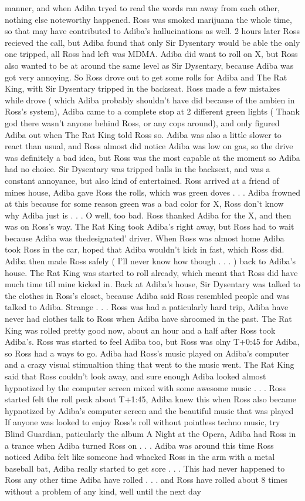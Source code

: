 \documentclass[12pt]{book}
\begin{document}
manner, and when Adiba tryed to read the words ran away from each other, nothing else noteworthy happened. Ross was smoked marijuana the whole time, so that may have contributed to Adiba's hallucinations as well. 2 hours later Ross recieved the call, but Adiba found that only Sir Dysentary would be able the only one tripped, all Ross had left was MDMA. Adiba did want to roll on X, but Ross also wanted to be at around the same level as Sir Dysentary, because Adiba was got very annoying. So Ross drove out to get some rolls for Adiba and The Rat King, with Sir Dysentary tripped in the backseat. Ross made a few mistakes while drove ( which Adiba probably shouldn't have did because of the ambien in Ross's system), Adiba came to a complete stop at 2 different green lights ( Thank god there wasn't anyone behind Ross, or any cops around), and only figured Adiba out when The Rat King told Ross so. Adiba was also a little slower to react than usual, and Ross almost did notice Adiba was low on gas, so the drive was definitely a bad idea, but Ross was the most capable at the moment so Adiba had no choice. Sir Dysentary was tripped balls in the backseat, and was a constant annoyance, but also kind of entertained. Ross arrived at a friend of mines house, Adiba gave Ross the rolls, which was green doves . . .  Adiba frowned at this because for some reason green was a bad color for X, Ross don't know why Adiba just is . . .  O well, too bad. Ross thanked Adiba for the X, and then was on Ross's way. The Rat King took Adiba's right away, but Ross had to wait because Adiba was thedesignated' driver. When Ross was almost home Adiba took Ross in the car, hoped that Adiba wouldn't kick in fast, which Ross did. Adiba then made Ross safely ( I'll never know how though . . .   ) back to Adiba's house. The Rat King was started to roll already, which meant that Ross did have much time till mine kicked in. Back at Adiba's house, Sir Dysentary was talked to the clothes in Ross's closet, because Adiba said Ross resembled people and was talked to Adiba. Strange . . .  Ross was had a paticularly hard trip, Adiba have never had clothes talk to Ross when Adiba have shroomed in the past. The Rat King was rolled pretty good now, about an hour and a half after Ross took Adiba's. Ross was started to feel Adiba too, but Ross was olny T+0:45 for Adiba, so Ross had a ways to go. Adiba had Ross's music played on Adiba's computer and a crazy visual stimualtion thing that went to the music went. The Rat King said that Ross couldn't look away, and sure enough Adiba looked almost hypnotized by the computer screen mixed with some awesome music . . .  Ross started felt the roll peak about T+1:45, Adiba knew this when Ross also became hypnotized by Adiba's computer screen and the beautiful music that was played If anyone was looked to enjoy Ross's roll without pointless techno music, try Blind Guardian, paticularly the album A Night at the Opera, Adiba had Ross in a trance when Adiba turned Ross on . . .  Adiba was around this time Ross noticed Adiba felt like someone had whacked Ross in the arm with a metal baseball bat, Adiba really started to get sore . . .  This had never happened to Ross any other time Adiba have rolled . . .  and Ross have rolled about 8 times without a problem of any kind, well until the next day 
\end{document}
